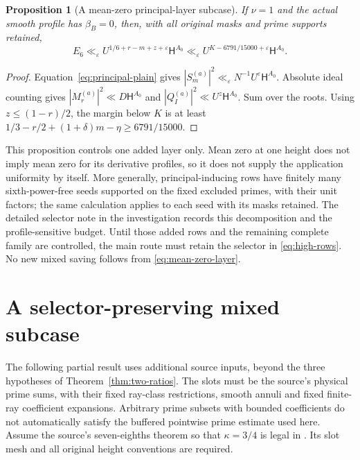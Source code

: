 \documentclass[11pt]{article}
\newtheorem{proposition}[theorem]{Proposition}
\theoremstyle{definition}
\theoremstyle{remark}
\numberwithin{equation}{section}
\newcommand{\HH}{\mathsf H}
\newcommand{\ee}{\varepsilon}
\begin{document}
\begin{proposition}[A mean-zero principal-layer subcase]\label{prop:mean-zero}
If $\nu=1$ and the actual smooth profile has $\beta_B=0$, then,
with all original masks and prime supports retained,
\begin{equation}\label{eq:mean-zero-layer}
E_6\ll_\ee U^{1/6+r-m+z+\ee}\HH^{A_0}
\ll_\ee U^{K-6791/15000+\ee}\HH^{A_0}.
\end{equation}
\end{proposition}
\begin{proof}
Equation~\eqref{eq:principal-plain} gives
$|S_m^{(a)}|^2\ll_\ee N^{-1}U^\ee\HH^{A_0}$.
Absolute ideal counting gives $|M_r^{(a)}|^2\ll D\HH^{A_0}$
and $|Q_I^{(a)}|^2\ll U^z\HH^{A_0}$. Sum over the roots.
Using $z\le(1-r)/2$, the margin below $K$ is at least
$1/3-r/2+(1+\delta)m-\eta\ge6791/15000$.
\end{proof}

This proposition controls one added layer only. Mean zero at one
height does not imply mean zero for its derivative profiles, so it
does not supply the application uniformity by itself. More generally,
principal-inducing rows have finitely many sixth-power-free seeds
supported on the fixed excluded primes, with their unit factors;
the same calculation applies to each seed with its masks retained.
The detailed selector note in the investigation records this
decomposition and the profile-sensitive budget. Until those added
rows and the remaining complete family are controlled, the main
route must retain the selector in \eqref{eq:high-rows}. No new mixed
saving follows from \eqref{eq:mean-zero-layer}.

\section{A selector-preserving mixed subcase}\label{sec:mixed-subcase}

The following partial result uses additional source inputs, beyond the
three hypotheses of Theorem~\ref{thm:two-ratios}. The slots must be the
source's physical prime sums, with their fixed ray-class restrictions,
smooth annuli and fixed finite-ray coefficient expansions. Arbitrary
prime subsets with bounded coefficients do not automatically satisfy
the buffered pointwise prime estimate used here.
Assume the source's seven-eighths theorem so that $\kappa=3/4$ is
legal in \cite[Lemma 18.1]{openai}. Its slot mesh and all original
height conventions are required.
\end{document}

